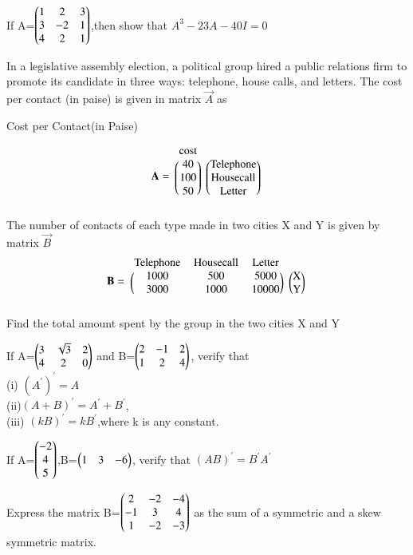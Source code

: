     \item If A=$\begin{pmatrix}1 &2 &3\\3 &-2 &1\\4 &2 &1\end{pmatrix}$,then show that $A^3-23A-40I=0$
    
    
    
\item In a legislative assembly election, a political
group hired a public relations firm to promote
its candidate in three ways: telephone, house
calls, and letters. The cost per contact (in paise)
is given in matrix $\vec{A}$ as
\begin{center}
Cost per Contact(in Paise)
\end{center}
\begin{align}
    \vec{A}=
    \begin{blockarray}{cc}
    \text{cost}\\
    \begin{block}{(c)(c)}
    40 &\text{Telephone}\\
    100&\text{Housecall} \\
    50&\text{Letter}\\
    \end{block}
    \end{blockarray}
\end{align}
The number of contacts of each type made in
two cities X and Y is given by matrix $\vec{B}$
\begin{align}
    \vec{B} =
    \begin{blockarray}{cccc}
    \text{Telephone} & \text{Housecall} & \text{Letter} \\
    \begin{block}{(ccc)(c)}
    1000 & 500 & 5000 & \text{X}\\
    3000 & 1000 & 10000 & \text{Y} \\
    \end{block}
    \end{blockarray}
\end{align}
Find the total
amount spent by the group in the two cities
X and Y
%
\solution


\item If A=$\begin{pmatrix}3 &\sqrt{3} &2\\4 &2 &0\end{pmatrix}$ and B=$\begin{pmatrix}2 &-1 &2\\1 &2 &4\end{pmatrix}$, verify that\\
(i) $(A^{'})^{'}=A$\\ (ii)$(A+B)^{'}=A^{'}+B^{'}$,\\ (iii) $(kB)^{'}=kB^{'}$,where k is any constant.\\
\item If A=$\begin{pmatrix}-2\\4 \\5\end{pmatrix}$,B=$\begin{pmatrix}1 &3 &-6\end{pmatrix}$, verify that $(AB)^{'}=B^{'}A^{'}$\\
\item Express the matrix B=$\begin{pmatrix}2 &-2 &-4\\-1 &3 &4\\1 &-2 &-3\end{pmatrix}$ as the sum of a symmetric and a skew symmetric matrix.\\
\solution
  
  
